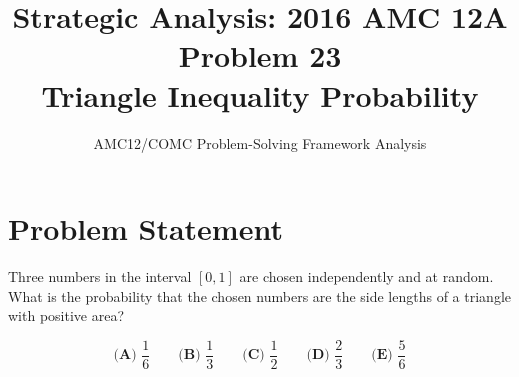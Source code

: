 \documentclass[11pt]{article}
\title{\textbf{Strategic Analysis: 2016 AMC 12A Problem 23\\
Triangle Inequality Probability}}
\author{AMC12/COMC Problem-Solving Framework Analysis}
\date{}
\begin{document}
\maketitle

\section*{Problem Statement}
Three numbers in the interval $[0,1]$ are chosen independently and at random. What is the probability that the chosen numbers are the side lengths of a triangle with positive area?

\[
\textbf{(A) }\frac{1}{6}\qquad\textbf{(B) }\frac{1}{3}\qquad\textbf{(C) }\frac{1}{2}\qquad\textbf{(D) }\frac{2}{3}\qquad\textbf{(E) }\frac{5}{6}
\]

\vspace{0.5cm}
\end{document}
